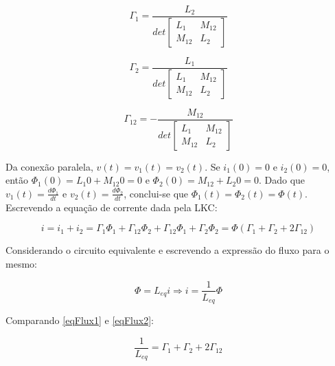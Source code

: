 \documentclass[12pt,fleqn]{book} %
\begin{document}
{\begin{equation}
\Gamma_1 = \frac{L_2}{det\begin{bmatrix}
L_1 & M_{12} \\M_{12} & L_2
\end{bmatrix}}
\end{equation}

\begin{equation}
\Gamma_2 = \frac{L_1}{det\begin{bmatrix}
L_1 & M_{12} \\M_{12} & L_2
\end{bmatrix}}
\end{equation}

\begin{equation}
\Gamma_{12} = -\frac{M_{12}}{det\begin{bmatrix}
L_1 & M_{12} \\M_{12} & L_2
\end{bmatrix}}
\end{equation}

Da conexão paralela, $v(t)=v_1(t)=v_2(t)$. Se $i_1(0)=0$ e $i_2(0)=0$, então $\Phi_1(0)=L_1 0+M_12 0= 0$ e $\Phi_2 (0)=M_12+L_2 0=0$. Dado que $v_1 (t)=\frac{d\Phi_1}{dt}$ e $v_2(t)=\frac{d\Phi_2}{dt}$, conclui-se que $\Phi_1(t)=\Phi_2(t)=\Phi(t)$. 
Escrevendo a equação de corrente dada pela LKC:

\begin{equation}\label{eqFlux1}
i=i_1+i_2=\Gamma_1 \Phi_1+\Gamma_{12} \Phi_2+\Gamma_12 \Phi_1+\Gamma_2 \Phi_2=\Phi(\Gamma_1+\Gamma_2+2\Gamma_{12} )
\end{equation}

Considerando o circuito equivalente e escrevendo a expressão do fluxo para o mesmo:

\begin{equation}\label{eqFlux2}
\Phi=L_{eq} i \Rightarrow i=\frac{1}{L_{eq}}\Phi
\end{equation}

Comparando \ref{eqFlux1} e \ref{eqFlux2}:

\begin{equation}
 \frac{1}{L_{eq}} = \Gamma_1+\Gamma_2+2\Gamma_{12}
\end{equation}



            
	
}
\end{document}
